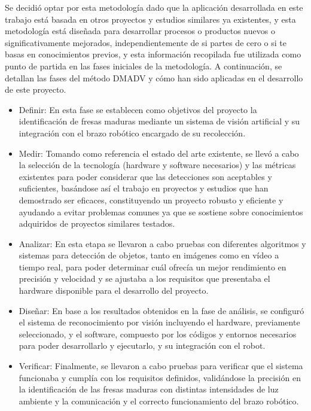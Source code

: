Se decidió optar por esta metodología dado que la aplicación desarrollada en este trabajo está basada en otros proyectos y estudios similares ya existentes, y esta metodología está diseñada para desarrollar procesos o productos nuevos o significativamente mejorados, independientemente de si partes de cero o si te basas en conocimientos previos, y esta información recopilada fue utilizada como punto de partida en las fases iniciales de la metodología. A continuación, se detallan las fases del método DMADV y cómo han sido aplicadas en el desarrollo de este proyecto.

\begin{itemize}
  \item Definir: En esta fase se establecen como objetivos del proyecto la identificación de fresas maduras mediante un sistema de visión artificial y su integración con el brazo robótico encargado de su recolección. 
  \item Medir: Tomando como referencia el estado del arte existente, se llevó a cabo la selección de la tecnología (hardware y software necesarios) y las métricas existentes para poder considerar que las detecciones son aceptables y suficientes, basándose así el trabajo en proyectos y estudios que han demostrado ser eficaces, constituyendo un proyecto robusto y eficiente y ayudando a evitar problemas comunes ya que se sostiene sobre conocimientos adquiridos de proyectos similares testados. 
  \item Analizar: En esta etapa se llevaron a cabo pruebas con diferentes algoritmos y sistemas para detección de objetos, tanto en imágenes como en vídeo a tiempo real, para poder determinar cuál ofrecía un mejor rendimiento en precisión y velocidad y se ajustaba a los requisitos que presentaba el hardware disponible para el desarrollo del proyecto.  
  \item Diseñar: En base a los resultados obtenidos en la fase de análisis, se configuró el sistema de reconocimiento por visión incluyendo el hardware, previamente seleccionado, y el software, compuesto por los códigos y entornos necesarios para poder desarrollarlo y ejecutarlo, y su integración con el robot.
  \item Verificar: Finalmente, se llevaron a cabo pruebas para verificar que el sistema funcionaba y cumplía con los requisitos definidos, validándose la precisión en la identificación de las fresas maduras con distintas intensidades de luz ambiente y la comunicación y el correcto funcionamiento del brazo robótico.
\end{itemize}
  
